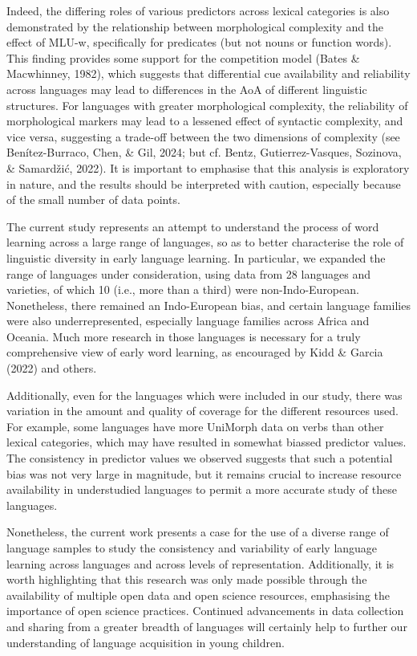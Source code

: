 \documentclass[10pt, letterpaper]{article}
\begin{document}
Indeed, the differing roles of various predictors across lexical
categories is also demonstrated by the relationship between
morphological complexity and the effect of MLU-w, specifically for
predicates (but not nouns or function words). This finding provides some
support for the competition model (Bates \& Macwhinney, 1982), which
suggests that differential cue availability and reliability across
languages may lead to differences in the AoA of different linguistic
structures. For languages with greater morphological complexity, the
reliability of morphological markers may lead to a lessened effect of
syntactic complexity, and vice versa, suggesting a trade-off between the
two dimensions of complexity (see Benítez-Burraco, Chen, \& Gil, 2024;
but cf. Bentz, Gutierrez-Vasques, Sozinova, \& Samardžić, 2022). It is
important to emphasise that this analysis is exploratory in nature, and
the results should be interpreted with caution, especially because of
the small number of data points.

The current study represents an attempt to understand the process of
word learning across a large range of languages, so as to better
characterise the role of linguistic diversity in early language
learning. In particular, we expanded the range of languages under
consideration, using data from 28 languages and varieties, of which 10
(i.e., more than a third) were non-Indo-European. Nonetheless, there
remained an Indo-European bias, and certain language families were also
underrepresented, especially language families across Africa and
Oceania. Much more research in those languages is necessary for a truly
comprehensive view of early word learning, as encouraged by Kidd \&
Garcia (2022) and others.

Additionally, even for the languages which were included in our study,
there was variation in the amount and quality of coverage for the
different resources used. For example, some languages have more UniMorph
data on verbs than other lexical categories, which may have resulted in
somewhat biassed predictor values. The consistency in predictor values
we observed suggests that such a potential bias was not very large in
magnitude, but it remains crucial to increase resource availability in
understudied languages to permit a more accurate study of these
languages.

Nonetheless, the current work presents a case for the use of a diverse
range of language samples to study the consistency and variability of
early language learning across languages and across levels of
representation. Additionally, it is worth highlighting that this
research was only made possible through the availability of multiple
open data and open science resources, emphasising the importance of open
science practices. Continued advancements in data collection and sharing
from a greater breadth of languages will certainly help to further our
understanding of language acquisition in young children.
\end{document}
